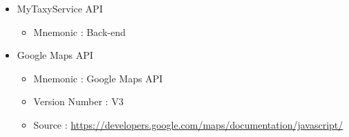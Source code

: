 \documentclass[12pt, a4paper]{article}
\begin{document}
\begin{itemize}
	\item MyTaxyService API
	\begin{itemize}
		\item Mnemonic : Back-end
	\end{itemize}
	\item Google Maps API
	\begin{itemize}
		\item Mnemonic : Google Maps API
		\item Version Number : V3
		\item Source : \url{https://developers.google.com/maps/documentation/javascript/} 
	\end{itemize}

\end{itemize}
\end{document}
